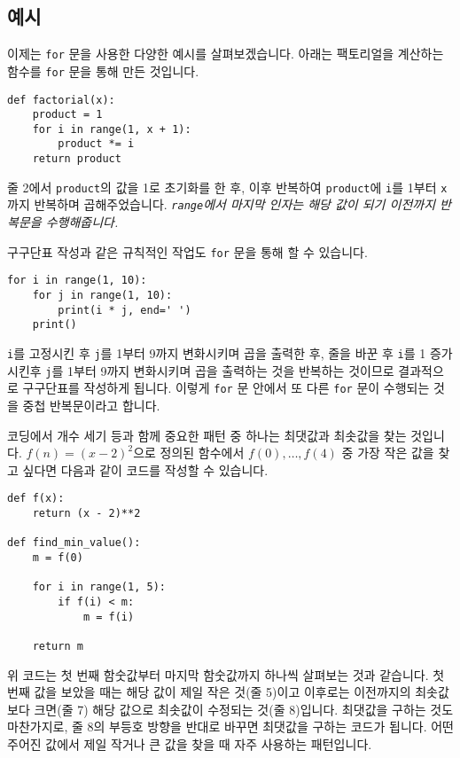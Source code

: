 \documentclass[../main.tex]{subfiles}
\begin{document}
\subsection{예시}
이제는 \texttt{for} 문을 사용한 다양한 예시를 살펴보겠습니다.
아래는 팩토리얼을 계산하는 함수를 \texttt{for} 문을 통해 만든 것입니다.
\begin{verbatim}
def factorial(x):
    product = 1
    for i in range(1, x + 1):
        product *= i
    return product
\end{verbatim}
줄 2에서 \texttt{product}의 값을 1로 초기화를 한 후, 이후 반복하여
\verb|product|에 \verb|i|를 1부터 \verb|x|까지 반복하며 곱해주었습니다.
\emph{\texttt{range}에서 마지막 인자는 해당 값이 되기 이전까지 반복문을
수행해줍니다.}

구구단표 작성과 같은 규칙적인 작업도 \texttt{for} 문을 통해 할 수 있습니다.
\begin{verbatim}
for i in range(1, 10):
    for j in range(1, 10):
        print(i * j, end=' ')
    print()
\end{verbatim}
\texttt{i}를 고정시킨 후 \texttt{j}를 1부터 9까지 변화시키며 곱을 출력한 후, 줄을 바꾼 후 \texttt{i}를 1 증가시킨후 \texttt{j}를 1부터 9까지 변화시키며 곱을 출력하는 것을 반복하는 것이므로 결과적으로 구구단표를 작성하게 됩니다.
이렇게 \texttt{for} 문 안에서 또 다른 \texttt{for} 문이 수행되는 것을 중첩 반복문이라고 합니다.

코딩에서 개수 세기 등과 함께 중요한 패턴 중 하나는 최댓값과 최솟값을 찾는 것입니다.
$f(n) = (x - 2)^2$으로 정의된 함수에서 $f(0), \dots, f(4)$ 중 가장 작은 값을
찾고 싶다면 다음과 같이 코드를 작성할 수 있습니다.
\begin{verbatim}
def f(x):
    return (x - 2)**2

def find_min_value():
    m = f(0)

    for i in range(1, 5):
        if f(i) < m:
            m = f(i)

    return m
\end{verbatim}
위 코드는 첫 번째 함숫값부터 마지막 함숫값까지 하나씩 살펴보는 것과 같습니다.
첫 번째 값을 보았을 때는 해당 값이 제일 작은 것(줄 5)이고 이후로는 이전까지의
최솟값보다 크면(줄 7) 해당 값으로 최솟값이 수정되는 것(줄 8)입니다.
최댓값을 구하는 것도 마찬가지로, 줄 8의 부등호 방향을 반대로 바꾸면 최댓값을 구하는 코드가 됩니다.
어떤 주어진 값에서 제일 작거나 큰 값을 찾을 때 자주 사용하는 패턴입니다.
\end{document}
